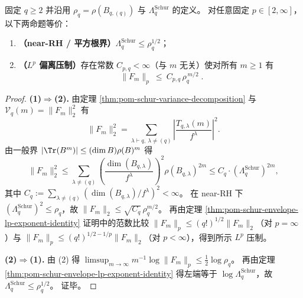 \begin{corollary}\label{cor:pom-schur-near-rh-lp-suppression-equivalence}
固定 \(q\ge 2\) 并沿用 \(\rho_q=\rho(B_{q,(q)})\) 与 \(\Lambda_q^{\mathrm{Schur}}\) 的定义。
对任意固定 \(p\in[2,\infty]\)，以下两命题等价：
\begin{enumerate}
  \item \textbf{（near-RH / 平方根界）}\(\Lambda_q^{\mathrm{Schur}}\le \rho_q^{1/2}\)；
  \item \textbf{（\texorpdfstring{$L^p$}{Lp} 偏离压制）}存在常数 \(C_{p,q}<\infty\)（与 \(m\) 无关）使对所有 \(m\ge 1\) 有
  \[
  \boxed{\;
  \|F_m\|_p\ \le\ C_{p,q}\,\rho_q^{\,m/2}\; } .
  \]
\end{enumerate}
\end{corollary}
\begin{proof}
\textbf{(1)\(\Rightarrow\)(2).}
由定理 \ref{thm:pom-schur-variance-decomposition} 与 \(\mathcal V_q(m)=\|F_m\|_2^2\) 有
\[
\|F_m\|_2^2=\sum_{\lambda\vdash q,\ \lambda\neq(q)}\left|\frac{T_{q,\lambda}(m)}{f^\lambda}\right|^2.
\]
由一般界 \(|\Tr(B^m)|\le (\dim B)\rho(B)^m\) 得
\[
\|F_m\|_2^2\le
\sum_{\lambda\neq(q)}\left(\frac{\dim(B_{q,\lambda})}{f^\lambda}\right)^2\rho(B_{q,\lambda})^{2m}
\le
C_q\cdot(\Lambda_q^{\mathrm{Schur}})^{2m},
\]
其中 \(C_q:=\sum_{\lambda\neq(q)}(\dim(B_{q,\lambda})/f^\lambda)^2<\infty\)。
在 near-RH 下 \((\Lambda_q^{\mathrm{Schur}})^2\le \rho_q\)，故 \(\|F_m\|_2\le \sqrt{C_q}\,\rho_q^{m/2}\)。
再由定理 \ref{thm:pom-schur-envelope-lp-exponent-identity} 证明中的范数比较 \(\|F_m\|_p\le (q!)^{1/2}\|F_m\|_2\)（对 \(p=\infty\)）与
\(\|F_m\|_p\le (q!)^{1/2-1/p}\|F_m\|_2\)（对 \(p<\infty\)），得到所示 \(L^p\) 压制。
\par
\textbf{(2)\(\Rightarrow\)(1).}
由 (2) 得
\(
\limsup_{m\to\infty}m^{-1}\log\|F_m\|_p\le \tfrac12\log\rho_q
\)。
再由定理 \ref{thm:pom-schur-envelope-lp-exponent-identity} 得左端等于 \(\log\Lambda_q^{\mathrm{Schur}}\)，故 \(\Lambda_q^{\mathrm{Schur}}\le \rho_q^{1/2}\)。
证毕。
\end{proof}

